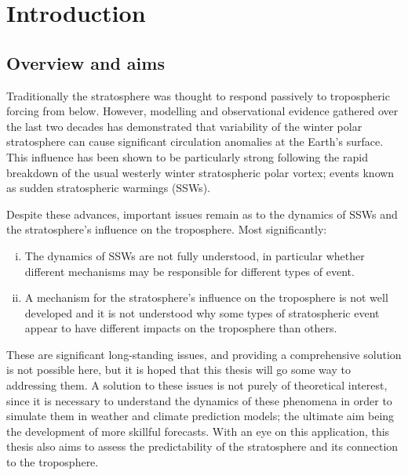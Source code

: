 \chapter{Introduction}
\label{cha:intro}

\section{Overview and aims}

Traditionally the stratosphere was thought to respond passively to tropospheric
forcing from below. However, modelling and observational evidence gathered over
the last two decades has demonstrated that variability of the winter polar
stratosphere can cause significant circulation anomalies at the Earth's
surface. This influence has been shown to be particularly strong following the
rapid breakdown of the usual westerly winter stratospheric polar vortex; events
known as sudden stratospheric warmings (SSWs).

Despite these advances, important issues remain as to the dynamics of SSWs
and the stratosphere's influence on the troposphere. Most significantly:
\begin{enumerate}[i.]
\item The dynamics of SSWs are not fully understood, in particular whether
  different mechanisms may be responsible for different types of event.
\item A mechanism for the stratosphere's influence on the troposphere is not
  well developed and it is not understood why some types of stratospheric event
  appear to have different impacts on the troposphere than others.
\end{enumerate}
These are significant long-standing issues, and providing a comprehensive
solution is not possible here, but it is hoped that this thesis will go some way
to addressing them. A solution to these issues is not purely of theoretical
interest, since it is necessary to understand the dynamics of these phenomena in
order to simulate them in weather and climate prediction models; the ultimate
aim being the development of more skillful forecasts. With an eye on this
application, this thesis also aims to assess the predictability of the
stratosphere and its connection to the troposphere.

